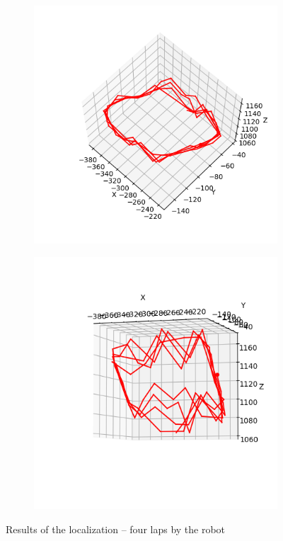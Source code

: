 \begin{figure}
\centering
\begin{subfigure}{0.48\linewidth}
	\includegraphics[width=\linewidth]{img/experiments/square-nice.png}
\end{subfigure}
\begin{subfigure}{0.48\linewidth}
	\includegraphics[width=\linewidth]{img/experiments/square-ugly.png}
\end{subfigure}
\caption{Results of the localization -- four laps by the robot}
\label{fig:square-results}
\end{figure}

